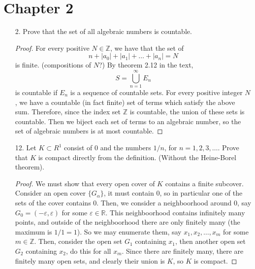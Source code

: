\documentclass[hidelinks,12pt]{article}
\newcommand{\R}{\mathbb{R}}
\newcommand{\Z}{\mathbb{Z}}
\begin{document}
\section{Chapter 2}
\begin{enumerate}
    \item[2.] Prove that the set of all algebraic numbers is countable.
        \begin{proof}
            For every positive $N\in\Z$, we have that the set of
            \[
                n+|a_0|+|a_1|+\dots+|a_n|=N
            \]
            is finite. (compositions of $N$?) By theorem 2.12 in the text,
            \[
                S=\bigcup_{n=1}^{\infty}E_n
            \]
            is countable if $E_n$ is a sequence of countable sets. For every positive integer $N$, we have a countable (in fact finite) set of terms which satisfy the above sum. Therefore, since the index set $\Z$ is countable, the union of these sets is countable. Then we biject each set of terms to an algebraic number, so the set of algebraic numbers is at most countable.
        \end{proof}
    \item[12.] Let \(K\subset R^1\) consist of \(0\) and the numbers \(1/n\), for \(n=1,2,3,\dots\). Prove that \(K\) is compact directly from the definition. (Without the Heine-Borel theorem).  
        \begin{proof}
            We must show that every open cover of \(K\) contains a finite subcover. Consider an open cover \(\{G_{\alpha}\}\), it must contain 0, so in particular one of the sets of the cover contains 0. Then, we consider a neighboorhood around 0, say \(G_0=(-\varepsilon,\varepsilon)\) for some \(\varepsilon\in\R\). This neighboorhood contains infinitely many points, and outside of the neighboorhood there are only finitely many (the maximum is \(1/1=1\)). So we may enumerate them, say \(x_1,x_2,\dots,x_m\) for some \(m\in\Z\). Then, consider the open set \(G_1\) containing \(x_1\), then another open set \(G_2\) containing \(x_2\), do this for all \(x_m\). Since there are finitely many, there are finitely many open sets, and clearly their union is \(K\), so \(K\) is compact.
        \end{proof}
\end{enumerate}
\end{document}
